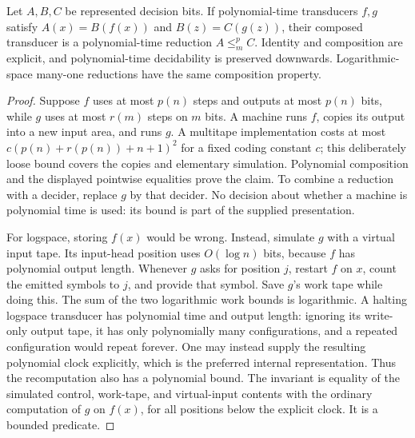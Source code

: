 \begin{theorem}\label{thm:N01}
Let $A,B,C$ be represented decision bits. If polynomial-time transducers $f,g$
satisfy $A(x)=B(f(x))$ and $B(z)=C(g(z))$, their composed transducer is a
polynomial-time reduction $A\leq_m^p C$. Identity and composition are explicit,
and polynomial-time decidability is preserved downwards. Logarithmic-space
many-one reductions have the same composition property.
\end{theorem}
\begin{proof}
Suppose $f$ uses at most $p(n)$ steps and outputs at most $p(n)$ bits, while
$g$ uses at most $r(m)$ steps on $m$ bits. A machine runs $f$, copies its output
into a new input area, and runs $g$. A multitape implementation costs at most
$c(p(n)+r(p(n))+n+1)^2$ for a fixed coding constant $c$; this deliberately
loose bound covers the copies and elementary simulation. Polynomial
composition and the displayed pointwise equalities prove the claim. To
combine a reduction with a decider, replace $g$ by that decider. No decision
about whether a machine is polynomial time is used: its bound is part of the
supplied presentation.

For logspace, storing $f(x)$ would be wrong. Instead, simulate $g$ with a
virtual input tape. Its input-head position uses $O(\log n)$ bits, because
$f$ has polynomial output length. Whenever $g$ asks for position $j$, restart
$f$ on $x$, count the emitted symbols to $j$, and provide that symbol. Save
$g$'s work tape while doing this. The sum of the two logarithmic work bounds
is logarithmic. A halting logspace transducer has polynomial time and output
length: ignoring its write-only output tape, it has only polynomially many
configurations, and a repeated configuration would repeat forever. One may
instead supply the resulting polynomial clock explicitly, which is the
preferred internal representation. Thus the recomputation also has a
polynomial bound. The invariant is equality of the simulated control,
work-tape, and virtual-input contents with the ordinary computation of $g$ on
$f(x)$, for all positions below the explicit clock. It is a bounded predicate.
\end{proof}

